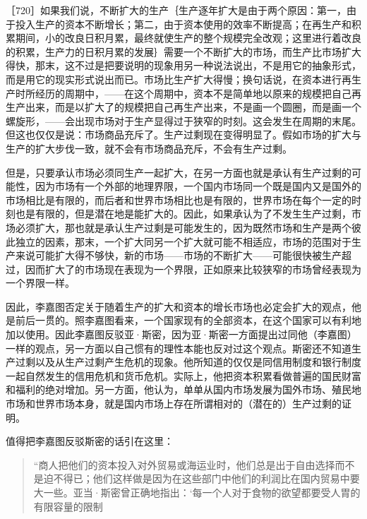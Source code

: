 
［720］如果我们说，不断扩大的生产｛生产逐年扩大是由于两个原因：第一，由于投入生产的资本不断增长；第二，由于资本使用的效率不断提高；在再生产和积累期间，小的改良日积月累，最终就使生产的整个规模完全改观；这里进行着改良的积累，生产力的日积月累的发展｝需要一个不断扩大的市场，而生产比市场扩大得快，那末，这不过是把要说明的现象用另一种说法说出，不是用它的抽象形式，而是用它的现实形式说出而已。市场比生产扩大得慢；换句话说，在资本进行再生产时所经历的周期中，——在这个周期中，资本不是简单地以原来的规模把自己再生产出来，而是以扩大了的规模把自己再生产出来，不是画一个圆圈，而是画一个螺旋形，——会出现市场对于生产显得过于狭窄的时刻。这会发生在周期的末尾。但这也仅仅是说：市场商品充斥了。生产过剩现在变得明显了。假如市场的扩大与生产的扩大步伐一致，就不会有市场商品充斥，不会有生产过剩。

但是，只要承认市场必须同生产一起扩大，在另一方面也就是承认有生产过剩的可能性，因为市场有一个外部的地理界限，一个国内市场同一个既是国内又是国外的市场相比是有限的，而后者和世界市场相比也是有限的，世界市场在每个一定的时刻也是有限的，但是潜在地是能扩大的。因此，如果承认为了不发生生产过剩，市场必须扩大，那也就是承认生产过剩是可能发生的，因为既然市场和生产是两个彼此独立的因素，那末，一个扩大同另一个扩大就可能不相适应，市场的范围对于生产来说可能扩大得不够快，新的市场——市场的不断扩大——可能很快被生产超过，因而扩大了的市场现在表现为一个界限，正如原来比较狭窄的市场曾经表现为一个界限一样。

因此，李嘉图否定关于随着生产的扩大和资本的增长市场也必定会扩大的观点，他是前后一贯的。照李嘉图看来，一个国家现有的全部资本，在这个国家可以有利地加以使用。因此李嘉图反驳亚·斯密，因为亚·斯密一方面提出过同他（李嘉图）一样的观点，另一方面以自己惯有的理性本能也反对过这个观点。斯密还不知道生产过剩以及从生产过剩产生危机的现象。他所知道的仅仅是同信用制度和银行制度一起自然发生的信用危机和货币危机。实际上，他把资本积累看做普遍的国民财富和福利的绝对增加。另一方面，他认为，单单从国内市场发展为国外市场、殖民地市场和世界市场本身，就是国内市场上存在所谓相对的（潜在的）生产过剩的证明。

值得把李嘉图反驳斯密的话引在这里：

\begin{quote}{“商人把他们的资本投入对外贸易或海运业时，他们总是出于自由选择而不是迫不得已；他们这样做是因为在这些部门中他们的利润比在国内贸易中要大一些。亚当·斯密曾正确地指出：‘每一个人对于食物的欲望都要受人胃的有限容量的限制}\end{quote}

